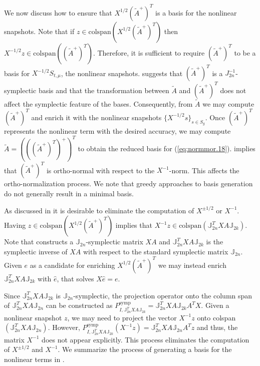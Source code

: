We now discuss how to ensure that $X^{1/2} (\tilde A^+)^T$ is a basis for the nonlinear snapshots. Note that if $z \in \text{colspan}\left(X^{1/2} (\tilde A^+)^T\right)$ then $X^{-1/2} z \in \text{colspan}\left(( \tilde A^+)^T \right)$. Therefore, it is sufficient to require $(\tilde A^+)^T$ to be a basis for $X^{-1/2}S_{t,\mu}$, the nonlinear snapshots.  suggests that $(\tilde A^+)^T$ is a $J_{2n}^{-1}$-symplectic basis and that the transformation between $\tilde A$ and $(\tilde A^+)^T $ does not affect the symplectic feature of the bases. Consequently, from $\tilde A$ we may compute $(\tilde A^+)^T$ and enrich it with the nonlinear snapshots $\{ X^{-1/2} s \}_{s\in S_{g}}$. Once $(\tilde A^+)^T$ represents the nonlinear term with the desired accuracy, we may compute $\tilde A= \left( \left( ( \tilde A^+ )^T \right)^+ \right)^T$ to obtain the reduced basis for (\ref{eq:normmor.18}).  implies that $(\tilde A^+)^T$ is ortho-normal with respect to the $X^{-1}$-norm. This affects the ortho-normalization process. We note that greedy approaches to basis generation do not generally result in a minimal basis.

As discussed in  it is desirable to eliminate the computation of $X^{\pm 1/2}$ or $X^{-1}$. Having $z \in \text{colspan}\left(X^{1/2} (\tilde A^+)^T\right)$ implies that $X^{-1} z \in \text{colspan}(\mathbb J_{2n}^T X A \mathbb J_{2k})$. Note that  constructs a $\mathbb J_{2n}$-symplectic matrix $XA$ and $\mathbb J_{2n}^T X A \mathbb J_{2k}$ is the symplectic inverse of $XA$ with respect to the standard symplectic matrix $\mathbb J_{2n}$. Given $e$ as a candidate for enriching $X^{1/2} (\tilde A^+)^T$ we may instead enrich $\mathbb J_{2n}^T X A \mathbb J_{2k}$ with $\hat e$, that solves $X \hat e = e$.

Since  $\mathbb J_{2n}^T X A \mathbb J_{2k}$ is $\mathbb J_{2n}$-symplectic, the projection operator onto the column span of $\mathbb J_{2n}^T X A \mathbb J_{2n}$ can be constructed as $P^{\text{symp}}_{I,\mathbb J_{2n}^T X A \mathbb J_{2k}}=\mathbb J_{2n}^T X A \mathbb J_{2k}A^TX$. Given a nonlinear snapshot $z$, we may need to project the vector $X^{-1}z$ onto colspan$(\mathbb J_{2n}^T X A \mathbb J_{2n})$. However, $P^{\text{symp}}_{I,\mathbb J_{2n}^T X A \mathbb J_{2k}}(X^{-1}z)=\mathbb J_{2n}^T X A \mathbb J_{2n}A^Tz$ and thus, the matrix $X^{-1}$ does not appear explicitly. This process eliminates the computation of $X^{\pm 1/2}$ and $X^{-1}$. We summarize the process of generating a basis for the nonlinear terms in .


